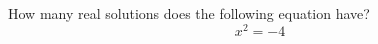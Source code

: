 \documentclass{ximera}
\author{David Kish}
\begin{document}
\begin{exercise}
How many real solutions does the following equation have? \\
\[
x^2=-4
\]
\begin{multipleChoice}  
\end{multipleChoice}  
\end{exercise}
\end{document}
